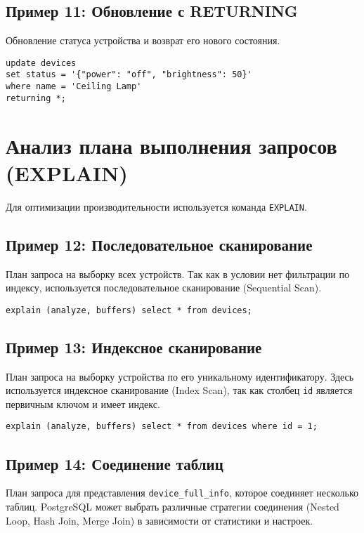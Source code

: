 \documentclass[oneside,a4paper,14pt]{extarticle}
\begin{document}
\subsection*{Пример 11: Обновление с RETURNING}

Обновление статуса устройства и возврат его нового состояния.

\begin{verbatim}
update devices 
set status = '{"power": "off", "brightness": 50}' 
where name = 'Ceiling Lamp' 
returning *;
\end{verbatim}

\section*{Анализ плана выполнения запросов (EXPLAIN)}

Для оптимизации производительности используется команда \texttt{EXPLAIN}.

\subsection*{Пример 12: Последовательное сканирование}

План запроса на выборку всех устройств. Так как в условии нет фильтрации по индексу, используется последовательное сканирование (Sequential Scan).

\begin{verbatim}
explain (analyze, buffers) select * from devices;
\end{verbatim}

\subsection*{Пример 13: Индексное сканирование}

План запроса на выборку устройства по его уникальному идентификатору. Здесь используется индексное сканирование (Index Scan), так как столбец \texttt{id} является первичным ключом и имеет индекс.

\begin{verbatim}
explain (analyze, buffers) select * from devices where id = 1;
\end{verbatim}

\subsection*{Пример 14: Соединение таблиц}

План запроса для представления \texttt{device\_full\_info}, которое соединяет несколько таблиц. PostgreSQL может выбрать различные стратегии соединения (Nested Loop, Hash Join, Merge Join) в зависимости от статистики и настроек.
\end{document}
